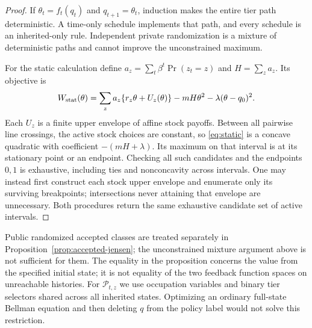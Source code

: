 \documentclass[11pt,letterpaper]{article}
\theoremstyle{definition}
\newcommand{\1}{\mathbf 1}
\begin{document}
\begin{proof}
If $\theta_t=f_t(q_t)$ and $q_{t+1}=\theta_t$, induction makes the entire tier path deterministic. A time-only schedule implements that path, and every schedule is an inherited-only rule. Independent private randomization is a mixture of deterministic paths and cannot improve the unconstrained maximum.

For the static calculation define $a_z=\sum_t\beta^t\Pr(z_t=z)$ and $H=\sum_z a_z$. Its objective is
\begin{equation}\label{eq:static}
 W_{\rm stat}(\theta)=\sum_z a_z\{r_z\theta+U_z(\theta)\}
             -mH\theta^2-\lambda(\theta-q_0)^2.
\end{equation}
Each $U_z$ is a finite upper envelope of affine stock payoffs. Between all pairwise line crossings, the active stock choices are constant, so \eqref{eq:static} is a concave quadratic with coefficient $-(mH+\lambda)$. Its maximum on that interval is at its stationary point or an endpoint. Checking all such candidates and the endpoints $0,1$ is exhaustive, including ties and nonconcavity across intervals. One may instead first construct each stock upper envelope and enumerate only its surviving breakpoints; intersections never attaining that envelope are unnecessary. Both procedures return the same exhaustive candidate set of active intervals.\end{proof}
Public randomized accepted classes are treated separately in Proposition~\ref{prop:accepted-jensen}; the unconstrained mixture argument above is not sufficient for them. The equality in the proposition concerns the value from the specified initial state; it is not equality of the two feedback function spaces on unreachable histories. For $\mathcal P_{t,z}$ we use occupation variables and binary tier selectors shared across all inherited states. Optimizing an ordinary full-state Bellman equation and then deleting $q$ from the policy label would not solve this restriction.
\end{document}
